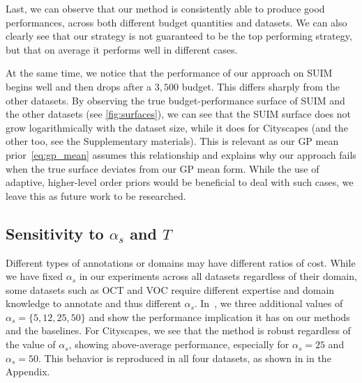 Last, we can observe that our method is consistently able to produce good performances, across both different budget quantities and datasets. We can also clearly see that our strategy is not guaranteed to be the top performing strategy, but that on average it performs well in different cases. 

At the same time, we notice that the performance of our approach on SUIM begins well and then drops after a $3,500$ budget. This differs sharply from the other datasets. By observing the true budget-performance surface of SUIM and the other datasets (see \cref{fig:surfaces}), we can see that the SUIM surface does not grow logarithmically with the dataset size, while it does for Cityscapes (and the other too, see the Supplementary materials). This is relevant as our GP mean prior~\eqref{eq:gp_mean} assumes this relationship and explains why our approach fails when the true surface deviates from our GP mean form. While the use of adaptive, higher-level order priors would be beneficial to deal with such cases, we leave this as future work to be researched.



\subsection{Sensitivity to \texorpdfstring{$\alpha_s$}{as} and \texorpdfstring{$T$}{T}}
Different types of annotations or domains may have different ratios of cost. While we have fixed $\alpha_s$ in our experiments across all datasets regardless of their domain, some datasets such as OCT and VOC require different expertise and domain knowledge to annotate and thus different $\alpha_s$. In~, we three additional values of $\alpha_s = \{5, 12, 25, 50\}$ and show the performance implication it has on our methods and the baselines. For Cityscapes, we see that the method is robust regardless of the value of $\alpha_s$, showing above-average performance, especially for $\alpha_s = 25$ and $\alpha_s = 50$. This behavior is reproduced in all four datasets, as shown in  in the Appendix.


